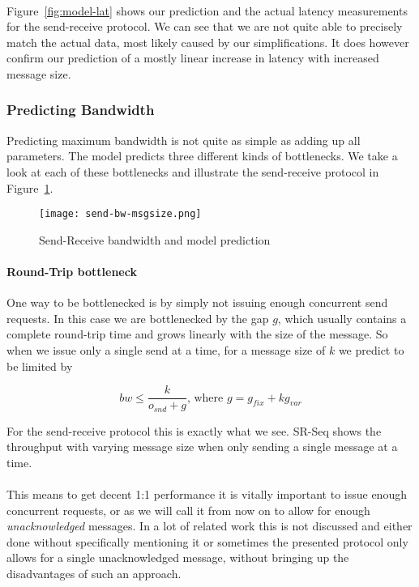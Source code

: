 \paragraph{} Figure~\ref{fig:model-lat} shows our prediction and the actual latency measurements for the send-receive protocol.
We can see that we are not quite able to precisely match the actual data, most likely caused by our simplifications. It does
however confirm our prediction of a mostly linear increase in latency with increased message size.


\subsubsection{Predicting Bandwidth}
Predicting maximum bandwidth is not quite as simple as adding up all parameters. The model predicts three different kinds of
bottlenecks. We take a look at each of these bottlenecks and illustrate the send-receive protocol in Figure~\ref{fig:model-bw}.

\begin{figure}[ht]
  \centering
  \texttt{[image: send-bw-msgsize.png]}
  \caption{Send-Receive bandwidth and model prediction}
    \label{fig:model-bw}
\end{figure}

\paragraph{Round-Trip bottleneck} One way to be bottlenecked is by simply not issuing enough concurrent send requests. In 
this case we are bottlenecked by the gap $g$, which usually contains a complete round-trip time and grows linearly with 
the size of the message. So when we issue only a single send at a time, for a message size of $k$ we predict to be limited by

$$
bw \leq \frac{k}{o_{snd} + g}\text{, where } g = g_{fix} + kg_{var} 
$$

For the send-receive protocol this is exactly what we see. SR-Seq shows the throughput with varying message size when only 
sending a single message at a time. 

\paragraph{} This means to get decent 1:1 performance it is vitally important to issue enough concurrent requests, or as we 
will call it from now on to allow for enough \emph{unacknowledged} messages. In a lot of related work this is not discussed
and either done without specifically mentioning it or sometimes the presented protocol only allows for a single unacknowledged
message, without bringing up the disadvantages of such an approach.


